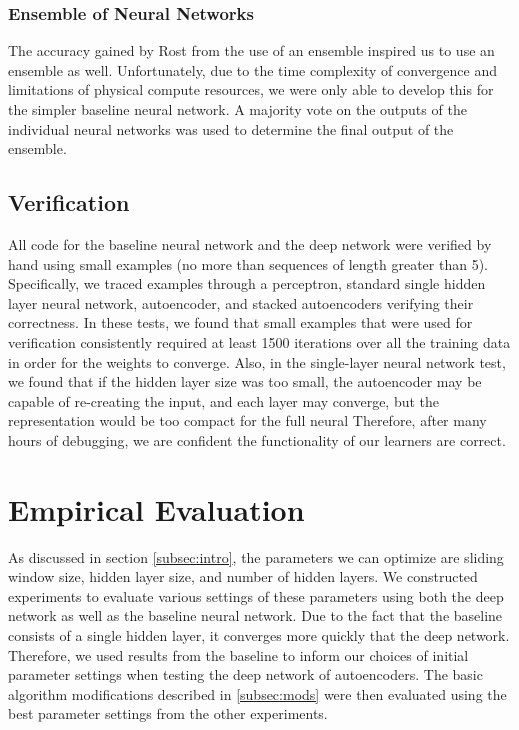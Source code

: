 \documentclass[letterpaper,twocolumn,12pt]{article}
\begin{document}
\subsubsection{Ensemble of Neural Networks}
The accuracy gained by Rost from the use of an ensemble inspired us to use an ensemble as well.
Unfortunately, due to the time complexity of convergence and limitations of physical compute resources, we were only able to develop this for the simpler baseline neural network.
A majority vote on the outputs of the individual neural networks was used to determine the final output of the ensemble.

\subsection{Verification}
All code for the baseline neural network and the deep network were verified by hand using small examples (no more than sequences of length greater than 5).
Specifically, we traced examples through a perceptron, standard single hidden layer neural network, autoencoder, and stacked autoencoders verifying their correctness.
In these tests, we found that small examples that were used for verification consistently required at least 1500 iterations over all the training data in order for the weights to converge.
Also, in the single-layer neural network test, we found that if the hidden layer size was too small, the autoencoder may be capable of re-creating the input, and each layer may converge, but the representation would be too compact for the full neural
Therefore, after many hours of debugging, we are confident the functionality of our learners are correct. 

\section{Empirical Evaluation}
As discussed in section \ref{subsec:intro}, the parameters we can optimize are sliding window size, hidden layer size, and number of hidden layers.
We constructed experiments to evaluate various settings of these parameters using both the deep network as well as the baseline neural network.
Due to the fact that the baseline consists of a single hidden layer, it converges more quickly that the deep network.
Therefore, we used results from the baseline to inform our choices of initial parameter settings when testing the deep network of autoencoders.
The basic algorithm modifications described in \ref{subsec:mods} were then evaluated using the best parameter settings from the other experiments.
\end{document}
